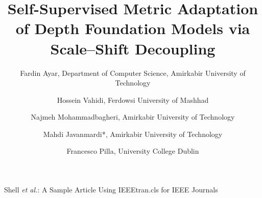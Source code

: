 \documentclass[journal]{IEEEtran}
\begin{document}
\title{Self-Supervised Metric Adaptation of Depth Foundation Models via Scale--Shift Decoupling}

\author{%
    Fardin Ayar, Department of Computer Science, Amirkabir University of Technology\\
    \and
    Hossein Vahidi, Ferdowsi University of Mashhad\\
    \and
    Najmeh Mohammadbagheri, Amirkabir University of Technology\\
    \and
    Mahdi Javanmardi*, Amirkabir University of Technology\\
    \and
    Francesco Pilla, University College Dublin\\
}





%
{Shell \MakeLowercase{\textit{et al.}}: A Sample Article Using IEEEtran.cls for IEEE Journals}


\maketitle
\end{document}
